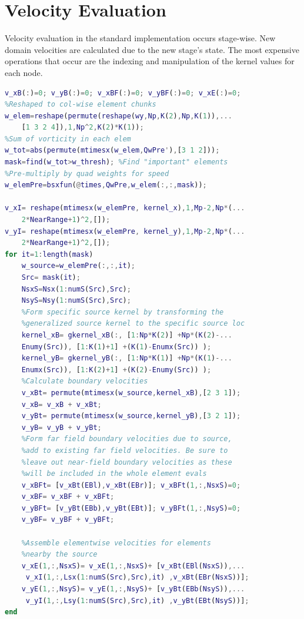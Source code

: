 \documentclass[letterpaper,12pt]{report}
\begin{document}
\section{Velocity Evaluation}
Velocity evaluation in the standard implementation occurs stage-wise. New domain velocities are calculated due to the new stage's state. The most expensive operations that occur are the indexing and manipulation of the kernel values for each node.

\singlespacing
\begin{lstlisting}[language=Matlab]
v_xB(:)=0; v_yB(:)=0; v_xBF(:)=0; v_yBF(:)=0; v_xE(:)=0;
%Reshaped to col-wise element chunks
w_elem=reshape(permute(reshape(wy,Np,K(2),Np,K(1)),...
	[1 3 2 4]),1,Np^2,K(2)*K(1));
%Sum of vorticity in each elem
w_tot=abs(permute(mtimesx(w_elem,QwPre'),[3 1 2]));
mask=find(w_tot>w_thresh); %Find "important" elements
%Pre-multiply by quad weights for speed
w_elemPre=bsxfun(@times,QwPre,w_elem(:,:,mask));

v_xI= reshape(mtimesx(w_elemPre, kernel_x),1,Mp-2,Np*(...
	2*NearRange+1)^2,[]);
v_yI= reshape(mtimesx(w_elemPre, kernel_y),1,Mp-2,Np*(...
	2*NearRange+1)^2,[]);
for it=1:length(mask)
    w_source=w_elemPre(:,:,it);
    Src= mask(it);
    NsxS=Nsx(1:numS(Src),Src);
    NsyS=Nsy(1:numS(Src),Src);
    %Form specific source kernel by transforming the 
    %generalized source kernel to the specific source loc
    kernel_xB= gkernel_xB(:, [1:Np*K(2)] +Np*(K(2)-...
    Enumy(Src)), [1:K(1)+1] +(K(1)-Enumx(Src)) );
    kernel_yB= gkernel_yB(:, [1:Np*K(1)] +Np*(K(1)-...
    Enumx(Src)), [1:K(2)+1] +(K(2)-Enumy(Src)) );
    %Calculate boundary velocities
    v_xBt= permute(mtimesx(w_source,kernel_xB),[2 3 1]);
    v_xB= v_xB + v_xBt;
    v_yBt= permute(mtimesx(w_source,kernel_yB),[3 2 1]);
    v_yB= v_yB + v_yBt;
    %Form far field boundary velocities due to source,
    %add to existing far field velocities. Be sure to 
    %leave out near-field boundary velocities as these
    %will be included in the whole element evals
    v_xBFt= [v_xBt(EBl),v_xBt(EBr)]; v_xBFt(1,:,NsxS)=0;
    v_xBF= v_xBF + v_xBFt;
    v_yBFt= [v_yBt(EBb),v_yBt(EBt)]; v_yBFt(1,:,NsyS)=0;
    v_yBF= v_yBF + v_yBFt;

    %Assemble elementwise velocities for elements
    %nearby the source
    v_xE(1,:,NsxS)= v_xE(1,:,NsxS)+ [v_xBt(EBl(NsxS)),...
	 v_xI(1,:,Lsx(1:numS(Src),Src),it) ,v_xBt(EBr(NsxS))];
    v_yE(1,:,NsyS)= v_yE(1,:,NsyS)+ [v_yBt(EBb(NsyS)),...
	 v_yI(1,:,Lsy(1:numS(Src),Src),it) ,v_yBt(EBt(NsyS))];
end

\end{lstlisting}
\doublespacing
\end{document}
